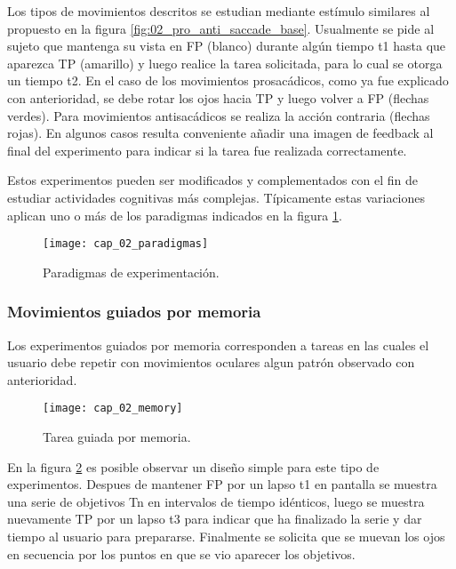 \documentclass[../main.tex]{subfiles}
\begin{document}
				Los tipos de movimientos descritos se estudian mediante estímulo similares al propuesto en la figura \ref{fig:02_pro_anti_saccade_base}. Usualmente se pide al sujeto que mantenga su vista en FP (blanco) durante algún tiempo t1 hasta que aparezca TP (amarillo) y luego realice la tarea solicitada, para lo cual se otorga un tiempo t2. En el caso de los movimientos prosacádicos, como ya fue explicado con anterioridad, se debe rotar los ojos hacia TP y luego volver a FP (flechas verdes). Para movimientos antisacádicos se realiza la acción contraria (flechas rojas). En algunos casos resulta conveniente añadir una imagen de feedback al final del experimento para indicar si la tarea fue realizada correctamente. 

				Estos experimentos pueden ser modificados y complementados con el fin de estudiar actividades cognitivas más complejas. Típicamente estas variaciones aplican uno o más de los paradigmas indicados en la figura \ref{fig:02_paradigmas}.
				\begin{figure}[H]
					\centering
					\texttt{[image: cap\_02\_paradigmas]}
					\caption{Paradigmas de experimentación.}
					\label{fig:02_paradigmas}
				\end{figure} 

			\subsubsection{Movimientos guiados por memoria}
			\label{ssub:movimientos_pro_anti_sacadicos}

				Los experimentos guiados por memoria corresponden a tareas en las cuales el usuario debe repetir con movimientos oculares algun patrón observado con anterioridad. 
				\begin{figure}[H]
					\centering
					\texttt{[image: cap\_02\_memory]}
					\caption{Tarea guiada por memoria.}
					\label{fig:02_memory}
				\end{figure} 
		
				En la figura \ref{fig:02_memory} es posible observar un diseño simple para este tipo de experimentos. Despues de mantener FP por un lapso t1 en pantalla se muestra una serie de objetivos Tn en intervalos de tiempo idénticos, luego se muestra nuevamente TP por un lapso t3 para indicar que ha finalizado la serie y dar tiempo al usuario para prepararse. Finalmente se solicita que se muevan los ojos en secuencia por los puntos en que se vio aparecer los objetivos. 
\end{document}
